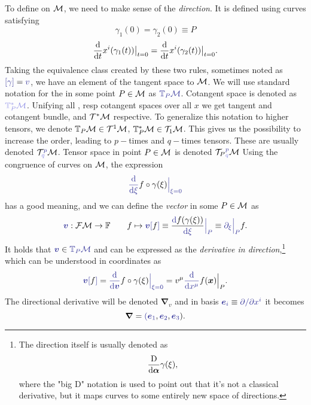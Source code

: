 To define  on $\mathcal{M}$, we need to make sense of the \emph{direction}. It is defined using curves satisfying 
$$\gamma_1(0)=\gamma_2(0)\equiv P$$
$$\frac{\mathrm{d} }{\mathrm{d} t}x^i(\gamma_1(t))\big|_{t=0}=\frac{\mathrm{d} }{\mathrm{d} t}x^i(\gamma_2(t))\big|_{t=0}.$$
Taking the equivalence class created by these two rules, sometimes noted as $\bluee{[\gamma]}=\bluee v$, we have an element of the tangent space to $\mathcal{M}$. We will use standard notation for the  in some point $P\in\mathcal{M}$ as $\bluee{\T_P\M}$. Cotangent space is denoted as $\blueee{\T^*_P\M}$. Unifying all , resp cotangent spaces over all $x$ we get tangent and cotangent bundle, \bluee{$\TT\M$} and $\mathcal{T}^*\mathcal{M}$ respective. To generalize this notation to higher tensors, we denote $\mathbb{T}_P\mathcal{M}\in \mathcal{T}^1\mathcal{M}$, $\mathbb{T}^*_P\mathcal{M}\in \mathcal{T}_1\mathcal{M}$. This gives us the possibility to increase the order, leading to $p-$times  and $q-$times  tensors. These are usually denoted $\TT^{\bluee p}_{\blueee q} \M$. Tensor space in point $P\in\mathcal{M}$ is denoted ${\TT_P}^{\bluee p}_{\blueee q} \M$
Using the congruence of curves on $\mathcal{M}$, the expression 
\begin{equation}
    \bluee{\der{}{\xi}}f\circ \gamma(\xi)\bluee{\Big|_{\xi=0}}
\end{equation}
has a good meaning, and we can define the \emph{vector} in some $P\in\mathcal{M}$ as
\begin{equation}
    \bluee{\bm v}: \FM\rightarrow \mathbb F \qquad f\mapsto \bluee{\bm v[}f\bluee ]\equiv \frac{\bluee \d f(\gamma(\xi))}{\bluee{\d \xi}}\bluee{\Big|_P} \equiv \bluee{\partial_\xi\Big|_P} f .
\end{equation}
It holds that $\bluee{\bm v}\in \bluee{\T_P\M}$ and can be expressed as the \emph{derivative in direction},\footnote{
        The direction itself is usually denoted as
        \begin{equation}
            \frac{\mathrm{D}}{\mathrm{d}\bm\alpha}\gamma(\xi),
        \end{equation}
        where the "big D" notation is used to point out that it's not a classical derivative, but it maps curves to some entirely new space of directions.
    } 
which can be understood in coordinates as
\begin{equation}
    \bluee{\bm v[}f\bluee ] = \bluee{\der{}{\bm v}} f\circ \gamma(\xi)\bluee{\Big|_{\xi=0}}=v^\mu\bluee{\der{}{x^\mu}} f(\bm x)\Big|_{P}.
\end{equation}
The directional derivative will be denoted $\bm\nabla_v$
and in basis $\bluee{\bm e_i} \equiv \bluee{\partial/\partial x^i}$ it becomes
$$\bm\nabla=\bluee(\bluee{\bm e_1}, \bluee{\bm e_2},\bluee{\bm e_3}).$$


